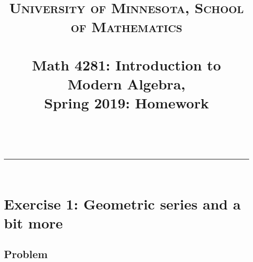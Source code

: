 \documentclass[paper=a4, fontsize=12pt]{scrartcl} %
\title{	
\normalfont \normalsize 
\textsc{University of Minnesota, School of Mathematics} \\ [25pt] %
\horrule{0.5pt} \\[0.4cm] %
\huge Math 4281: Introduction to Modern Algebra, \\
Spring 2019:
Homework \psetnumber\\%
\horrule{2pt} \\[0.5cm] %
}
\author{\myname}
\newcommand{\horrule}[1]{\rule{\linewidth}{#1}} %
\theoremstyle{plainsl}
\theoremstyle{definition}
\theoremstyle{remark}
\begin{document}
\maketitle %

\horrule{0.3pt} \\[0.4cm]

\section{Exercise 1: Geometric series and a bit more}

\subsection{Problem}
\end{document}
